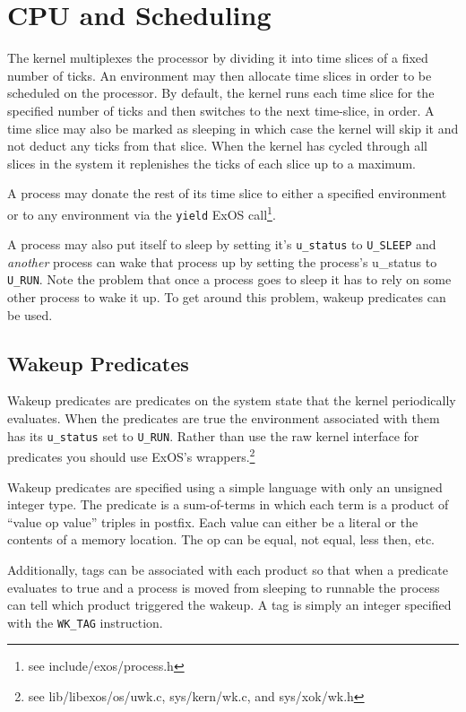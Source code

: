 \section{CPU and Scheduling}

The kernel multiplexes the processor by dividing it into time slices of
a fixed number of ticks. An environment may then allocate time slices
in order to be scheduled on the processor. By default, the kernel runs
each time slice for the specified number of ticks and then switches to
the next time-slice, in order. A time slice may also be marked as
sleeping in which case the kernel will skip it and not deduct any
ticks from that slice. When the kernel has cycled through all slices
in the system it replenishes the ticks of each slice up to a maximum.

A process may donate the rest of its time slice to either a specified
environment or to any environment via the {\tt yield} ExOS
call\footnote{see include/exos/process.h}. 

A process may also put itself to sleep by setting it's {\tt u\_status}
to {\tt U\_SLEEP} and {\em another} process can wake that process up
by setting the process's {u\_status} to {\tt U\_RUN}. Note the problem
that once a process goes to sleep it has to rely on some other process
to wake it up. To get around this problem, wakeup predicates can be
used.

\subsection {Wakeup Predicates}

Wakeup predicates are predicates on the system state that the kernel
periodically evaluates. When the predicates are true the environment
associated with them has its {\tt u\_status} set to {\tt U\_RUN}. Rather
than use the raw kernel interface for predicates you should use ExOS's
wrappers.\footnote{see lib/libexos/os/uwk.c, sys/kern/wk.c, and sys/xok/wk.h}

Wakeup predicates are specified using a simple language with only an
unsigned integer type. The predicate is a sum-of-terms in which
each term is a product of ``value op value'' triples in
postfix. Each value can either be a literal or the contents of a
memory location. The op can be equal, not equal, less then, etc.

Additionally, tags can be associated with each product so that when a
predicate evaluates to true and a process is moved from sleeping to
runnable the process can tell which product triggered the wakeup. A
tag is simply an integer specified with the {\tt WK\_TAG} instruction.

